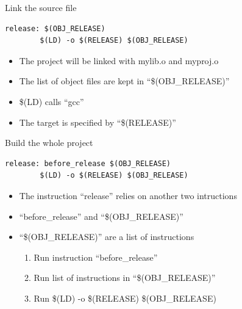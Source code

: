 \begin{frame}[fragile]{Link the source file}
\lstset{language=[gnu] make}
\begin{lstlisting}[linewidth=0.9\linewidth, xleftmargin=0.05\linewidth]
release: $(OBJ_RELEASE)
        $(LD) -o $(RELEASE) $(OBJ_RELEASE)
\end{lstlisting}
\vspace{-0.15in}
\begin{itemize}
	\item {The project will be linked with mylib.o and myproj.o}
	\item {The list of object files are kept in ``\$(OBJ\_RELEASE)''}
	\item {\$(LD) calls ``gcc''}
	\item {The target is specified by ``\$(RELEASE)''}
\end{itemize}

\end{frame}

\begin{frame}[fragile]{Build the whole project}
\lstset{language=[gnu] make}
\begin{lstlisting}[linewidth=0.9\linewidth, xleftmargin=0.05\linewidth]
release: before_release $(OBJ_RELEASE)
        $(LD) -o $(RELEASE) $(OBJ_RELEASE)
\end{lstlisting}
\vspace{-0.15in}
\begin{itemize}
	\item {The instruction ``release''  relies on another two intructions}
	\item {``before\_release'' and ``\$(OBJ\_RELEASE)''}
	\item {``\$(OBJ\_RELEASE)'' are a list of instructions}
	\begin{enumerate}
		\item {Run instruction ``before\_release''}
		\item {Run list of instructions in ``\$(OBJ\_RELEASE)''}
		\item {Run \$(LD) -o \$(RELEASE) \$(OBJ\_RELEASE)}
	\end{enumerate}
\end{itemize}

\end{frame}


